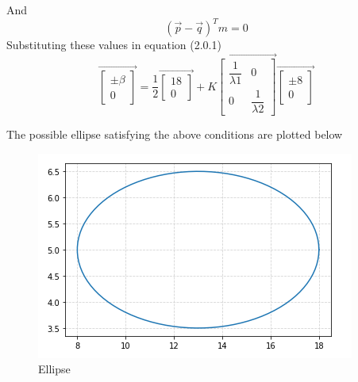 \documentclass[journal,12pt,twocolumn]{IEEEtran}
\begin{document}
And $$(\vec{p}-\vec{q})^Tm=0$$
Substituting these values in equation (2.0.1)
$$\vec{\begin{bmatrix}\pm \beta \\ 0 \end{bmatrix}}=\dfrac{1}{2}\vec{\begin{bmatrix} 18 \\ 0 \end{bmatrix}}+K \vec{\begin{bmatrix}
\dfrac{1}{\lambda1} & 0 \\
0 & \dfrac{1}{\lambda2}
\end{bmatrix}}\vec{\begin{bmatrix}\pm 8 \\ 0 \end{bmatrix}}$$

The possible ellipse satisfying the above
conditions are plotted below 

\begin{figure}[ht]
    \centering
    \includegraphics[width=\columnwidth]{ellipse.png}
    \caption{Ellipse}
    \label{Ellipse along given axis}
\end{figure}
\end{document}
